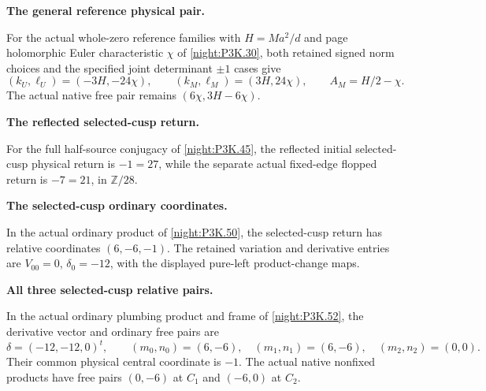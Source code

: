 \begin{proposition}\hypertarget{tag-01U7}{}\label{iv:correction:P3K.30}

\textbf{The general reference physical pair.}\par
For the actual whole-zero reference families with
\(H=Ma^2/d\) and page holomorphic Euler characteristic \(\chi\)
of \cref{night:P3K.30}, both retained signed norm choices and the
specified joint determinant \(\pm1\) cases give
\[
 (k_U,\ell_U)=(-3H,-24\chi),\qquad
 (k_M,\ell_M)=(3H,24\chi),\qquad
 A_M=H/2-\chi.
\]
The actual native free pair remains \((6\chi,3H-6\chi)\).
\end{proposition}

\begin{proposition}\hypertarget{tag-01UJ}{}\label{iv:correction:P3K.45}

\textbf{The reflected selected-cusp return.}\par
For the full half-source conjugacy of
\cref{night:P3K.45}, the reflected initial selected-cusp
physical return is \(-1=27\), while the separate actual
fixed-edge flopped return is \(-7=21\), in \(\mathbb Z/28\).
\end{proposition}

\begin{proposition}\hypertarget{tag-01UL}{}\label{iv:correction:P3K.50}

\textbf{The selected-cusp ordinary coordinates.}\par
In the actual ordinary product of
\cref{night:P3K.50}, the selected-cusp return has relative
coordinates \((6,-6,-1)\). The retained variation and
derivative entries are \(V_{00}=0\), \(\delta_0=-12\),
with the displayed pure-left product-change maps.
\end{proposition}

\begin{proposition}\hypertarget{tag-01UM}{}\label{iv:correction:P3K.52}

\textbf{All three selected-cusp relative pairs.}\par
In the actual ordinary plumbing product and frame
of \cref{night:P3K.52}, the derivative vector and ordinary
free pairs are
\[
 \delta=(-12,-12,0)^t,\qquad
 (m_0,n_0)=(6,-6),\quad(m_1,n_1)=(6,-6),\quad(m_2,n_2)=(0,0).
\]
Their common physical central coordinate is \(-1\).
The actual native nonfixed products have free pairs
\((0,-6)\) at \(C_1\) and \((-6,0)\) at \(C_2\).
\end{proposition}


